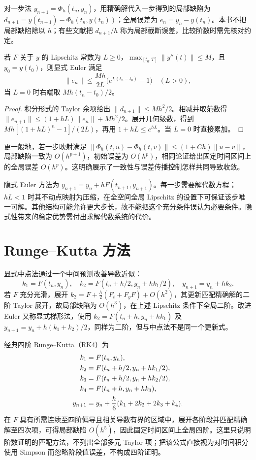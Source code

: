\documentclass[UTF8,12pt,a4paper,fontset=fandol]{ctexbook}
\begin{document}
\begin{definition}[局部缺陷与全局误差]
对一步法 $y_{n+1}=\Phi_h(t_n,y_n)$，用精确解代入一步得到的局部缺陷为 $d_{n+1}=y(t_{n+1})-\Phi_h(t_n,y(t_n))$；全局误差为 $e_n=y_n-y(t_n)$。本书不把局部缺陷除以 $h$；有些文献把 $d_{n+1}/h$ 称为局部截断误差，比较阶数时需先核对约定。
\end{definition}

\begin{theorem}
若 $F$ 关于 $y$ 的 Lipschitz 常数为 $L\ge0$，$\max_{[t_0,T]}\|y''(t)\|\le M$，且 $y_0=y(t_0)$，则显式 Euler 满足
\[
 \|e_n\|\le\frac{Mh}{2L}\bigl(e^{L(t_n-t_0)}-1\bigr)\quad(L>0),
\]
当 $L=0$ 时右端取 $Mh(t_n-t_0)/2$。
\end{theorem}
\begin{proof}
积分形式的 Taylor 余项给出 $\|d_{n+1}\|\le Mh^2/2$。相减并取范数得 $\|e_{n+1}\|\le(1+hL)\|e_n\|+Mh^2/2$。展开几何级数，得到 $Mh[(1+hL)^n-1]/(2L)$，再用 $1+hL\le e^{hL}$。当 $L=0$ 时直接累加。
\end{proof}

更一般地，若一步映射满足 $\|\Phi_h(t,u)-\Phi_h(t,v)\|\le(1+Ch)\|u-v\|$，局部缺陷一致为 $O(h^{p+1})$，初始误差为 $O(h^p)$，相同论证给出固定时间区间上的全局误差 $O(h^p)$。这明确展示了一致性与误差传播控制怎样共同导致收敛。

隐式 Euler 方法为 $y_{n+1}=y_n+hF(t_{n+1},y_{n+1})$。每一步需要解代数方程；$hL<1$ 时其不动点映射为压缩，在全空间全局 Lipschitz 的设置下可保证该步唯一可解。其他结构可能允许更大步长，故不能把这个充分条件误认为必要条件。隐式性带来的稳定优势需付出求解代数系统的代价。

\section{Runge--Kutta 方法}
显式中点法通过一个中间预测改善导数近似：
\[
 k_1=F(t_n,y_n),\quad k_2=F(t_n+h/2,y_n+hk_1/2),\quad y_{n+1}=y_n+hk_2.
\]
若 $F$ 充分光滑，展开 $k_2=F+\tfrac h2(F_t+F_yF)+O(h^2)$，其更新匹配精确解的二阶 Taylor 展开，故局部缺陷为 $O(h^3)$，在上述 Lipschitz 条件下全局二阶。改进 Euler 又称显式梯形法，使用 $k_2=F(t_n+h,y_n+hk_1)$ 及 $y_{n+1}=y_n+h(k_1+k_2)/2$，同样为二阶，但与中点法不是同一个更新式。

经典四阶 Runge--Kutta（RK4）为
\begin{align}
 k_1&=F(t_n,y_n),\notag\\
 k_2&=F(t_n+h/2,y_n+hk_1/2),\notag\\
 k_3&=F(t_n+h/2,y_n+hk_2/2),\notag\\
 k_4&=F(t_n+h,y_n+hk_3),\notag\\
 y_{n+1}&=y_n+\frac h6(k_1+2k_2+2k_3+k_4).
 \label{eq:na-rk4}
\end{align}
在 $F$ 具有所需连续至四阶偏导且相关导数有界的区域中，展开各阶段并匹配精确解至四次项，可得局部缺陷 $O(h^5)$，因此固定时间区间上全局四阶。这里只说明阶数证明的匹配方法，不列出全部多元 Taylor 项；把该公式直接视为对时间积分使用 Simpson 而忽略阶段值误差，不构成四阶证明。
\end{document}
